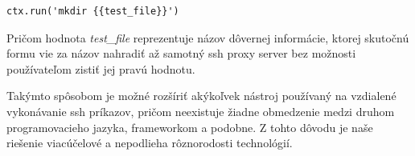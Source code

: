 \begin{Verbatim}[frame=single]
ctx.run('mkdir {{test_file}}')
\end{Verbatim}

Pričom hodnota \emph{test\_file} reprezentuje názov dôvernej informácie, ktorej skutočnú formu vie za názov nahradiť až samotný
ssh proxy server bez možnosti používateľom zistiť jej pravú hodnotu.

Takýmto spôsobom je možné rozšíriť akýkoľvek nástroj používaný na vzdialené vykonávanie ssh príkazov, pričom neexistuje
žiadne obmedzenie medzi druhom programovacieho jazyka, frameworkom a podobne.
Z tohto dôvodu je naše riešenie viacúčelové a nepodlieha rôznorodosti technológií.
